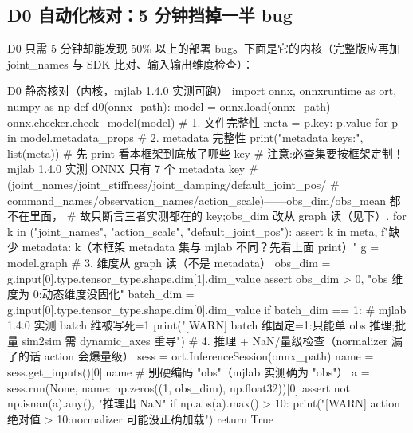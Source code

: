 \subsection{D0 自动化核对：5 分钟挡掉一半 bug}
\label{sec:rlmc-s2r-d0}

D0 只需 5 分钟却能发现 50\% 以上的部署 bug。下面是它的内核（完整版应再加 joint\_names 与 SDK 比对、输入输出维度检查）：

\begin{codebox}[Python]{D0 静态核对（内核，mjlab 1.4.0 实测可跑）}
import onnx, onnxruntime as ort, numpy as np
def d0(onnx_path):
    model = onnx.load(onnx_path)
    onnx.checker.check_model(model)                       # 1. 文件完整性
    meta = {p.key: p.value for p in model.metadata_props} # 2. metadata 完整性
    print("metadata keys:", list(meta))                   # 先 print 看本框架到底放了哪些 key
    # 注意:必查集要按框架定制！mjlab 1.4.0 实测 ONNX 只有 7 个 metadata key
    #   (joint_names/joint_stiffness/joint_damping/default_joint_pos/
    #    command_names/observation_names/action_scale)——obs_dim/obs_mean 都不在里面，
    #   故只断言三者实测都在的 key;obs_dim 改从 graph 读（见下）.
    for k in ("joint_names", "action_scale", "default_joint_pos"):
        assert k in meta, f"缺少 metadata: {k}（本框架 metadata 集与 mjlab 不同？先看上面 print）"
    g = model.graph                                        # 3. 维度从 graph 读（不是 metadata）
    obs_dim = g.input[0].type.tensor_type.shape.dim[1].dim_value
    assert obs_dim > 0, "obs 维度为 0:动态维度没固化"
    batch_dim = g.input[0].type.tensor_type.shape.dim[0].dim_value
    if batch_dim == 1:                                     # mjlab 1.4.0 实测 batch 维被写死=1
        print("[WARN] batch 维固定=1:只能单 obs 推理;批量 sim2sim 需 dynamic_axes 重导")
    # 4. 推理 + NaN/量级检查（normalizer 漏了的话 action 会爆量级）
    sess = ort.InferenceSession(onnx_path)
    name = sess.get_inputs()[0].name                      # 别硬编码 "obs"（mjlab 实测确为 "obs"）
    a = sess.run(None, {name: np.zeros((1, obs_dim), np.float32)})[0]
    assert not np.isnan(a).any(), "推理出 NaN"
    if np.abs(a).max() > 10:
        print("[WARN] action 绝对值 > 10:normalizer 可能没正确加载")
    return True
\end{codebox}

